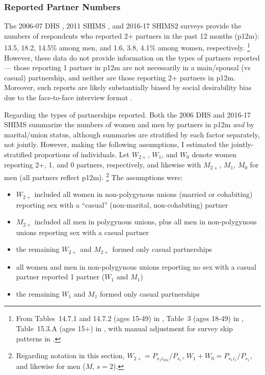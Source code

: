 \subsubsection{Reported Partner Numbers}\label{model.par.nsw.report}
The 2006-07 DHS \cite{SDHS2006}, 2011 SHIMS \cite{SHIMS1}, and 2016-17 SHIMS2 \cite{SHIMS2} surveys
provide the numbers of respondents who reported 2+ partners in the past 12 months (p12m):
13.5, 18.2, 14.5\% among men, and 1.6, 3.8, 4.1\% among women, respectively.%
\footnote{From
  Tables~14.7.1 and 14.7.2 (ages 15-49) in \cite{SDHS2006},
  Table~3 (ages 18-49) in \cite{SHIMS1},
  Table~15.3.A (ages 15+) in \cite{SHIMS2},
  with manual adjustment for survey skip patterns in \cite{SDHS2006,SHIMS2}.}
However, these data do not provide information on the types of partners reported
--- \ie those reporting 1 partner in p12m
are not necessarily in a main/spousal (vs casual) partnership,
and neither are those reporting 2+ partners in p12m.
Moreover, such reports are likely substantially biased by
social desirability bias due to the face-to-face interview format
\cite{Konings1995,Plummer2004,Gregson2004,Behanzin2013}.
\par
Regarding the types of partnerships reported.
Both the 2006 DHS \cite[Tables 14.6.1 and 14.6.2]{SDHS2006}
and 2016-17 SHIMS \cite[Tables 15.4.A and 15.4.B]{SHIMS2}
summarize the numbers of women and men by partners in p12m \emph{and} by marital/union status,
although summaries are stratified by each factor separately, not jointly.
However, making the following assumptions,
I estimated the jointly-stratified proportions of individuals.
Let $W_{2+}$, $W_{1}$, and $W_{0}$ denote women reporting 2+, 1, and 0 partners, respectively,
and likewise with $M_{2+}$, $M_{1}$, $M_{0}$ for men (all partners reflect p12m).%
\footnote{Regarding notation in this section,
  $W_{2+} = P_{s_{1}i_{234}} / P_{s_{1}}$,
  $W_{1} + W_{0} = P_{s_{1}i_{1}} / P_{s_{1}}$, and likewise for men ($M$, $s = 2$).}
The assumptions were:
\begin{itemize}
  \item $W_{2+}$ included all women in non-polygynous unions (married or cohabiting)
  reporting sex with a ``casual'' (non-marital, non-cohabiting) partner
  \item $M_{2+}$ included all men in polygynous unions,
  plus all men in non-polygynous unions reporting sex with a casual partner
  \item the remaining $W_{2+}$ and $M_{2+}$ formed only casual partnerships
  \item all women and men in non-polygynous unions
  reporting no sex with a casual partner reported 1 partner ($W_{1}$ and $M_{1}$)
  \item the remaining $W_{1}$ and $M_{1}$ formed only casual partnerships
\end{itemize}
